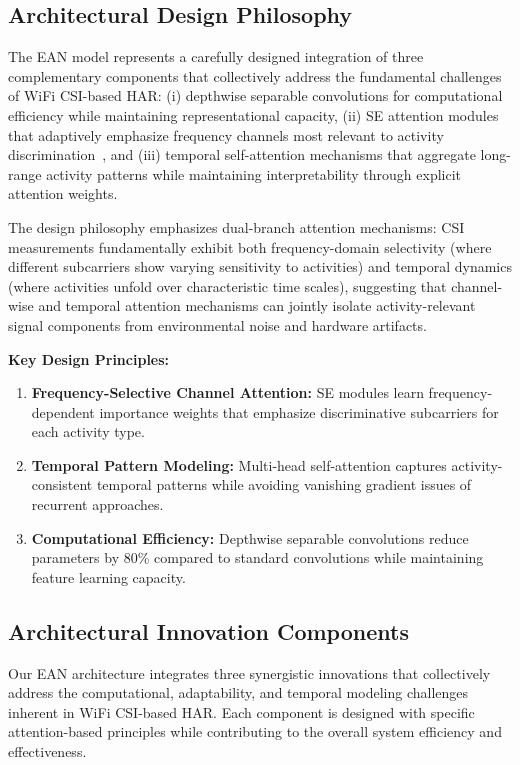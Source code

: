 \documentclass[lettersize,journal]{IEEEtran}
\begin{document}
\subsection{Architectural Design Philosophy}

The EAN model represents a carefully designed integration of three complementary components that collectively address the fundamental challenges of WiFi CSI-based HAR: (i) depthwise separable convolutions for computational efficiency while maintaining representational capacity, (ii) SE attention modules that adaptively emphasize frequency channels most relevant to activity discrimination~\cite{se_networks2018}, and (iii) temporal self-attention mechanisms that aggregate long-range activity patterns while maintaining interpretability through explicit attention weights.

The design philosophy emphasizes dual-branch attention mechanisms: CSI measurements fundamentally exhibit both frequency-domain selectivity (where different subcarriers show varying sensitivity to activities) and temporal dynamics (where activities unfold over characteristic time scales), suggesting that channel-wise and temporal attention mechanisms can jointly isolate activity-relevant signal components from environmental noise and hardware artifacts.

\textbf{Key Design Principles:}
\begin{enumerate}
\item \textbf{Frequency-Selective Channel Attention:} SE modules learn frequency-dependent importance weights that emphasize discriminative subcarriers for each activity type.
\item \textbf{Temporal Pattern Modeling:} Multi-head self-attention captures activity-consistent temporal patterns while avoiding vanishing gradient issues of recurrent approaches.
\item \textbf{Computational Efficiency:} Depthwise separable convolutions reduce parameters by 80\% compared to standard convolutions while maintaining feature learning capacity.
\end{enumerate}

\subsection{Architectural Innovation Components}

Our EAN architecture integrates three synergistic innovations that collectively address the computational, adaptability, and temporal modeling challenges inherent in WiFi CSI-based HAR. Each component is designed with specific attention-based principles while contributing to the overall system efficiency and effectiveness.
\end{document}
